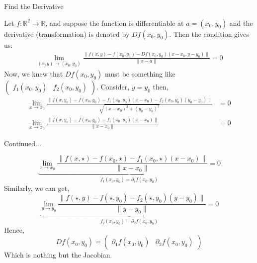 \documentclass[11pt]{beamer}
\theoremstyle{plain}
\begin{document}
\begin{frame}{Find the Derivative}
    \begin{example}
        Let $f:\mathbb R^2\rightarrow\mathbb R$, and suppose the function is differentiable at $a=(x_0,y_0)$ and the derivative (transformation) is denoted by $Df(x_0,y_0)$. Then the condition gives us:
        \begin{align*}
           \lim_{(x,y)\rightarrow(x_0,y_0)}  \frac{\| f(x,y)-f(x_0,y_0)-Df(x_0,y_0)(x-x_0,y-y_0)\|}{\|x-a\|}=0
        \end{align*}
        Now, we knew that $Df(x_0,y_0)$ must be something like $\begin{pmatrix}
            f_1(x_0,y_0)&f_2(x_0,y_0)
        \end{pmatrix}$. Consider, $y=y_0$ then, 
        \begin{align*}
            \lim_{x\rightarrow x_0}  \frac{\| f(x,y_0)-f(x_0,y_0)-f_1(x_0,y_0)(x-x_0)-f_2(x_0,y_0)(y_0-y_0)\|}{\sqrt{(x-x_0)^2+(y_0-y_0)^2}}&=0\\
            \lim_{x\rightarrow x_0}  \frac{\| f(x,y_0)-f(x_0,y_0)-f_1(x_0,y_0)(x-x_0)\|}{\|x-x_0\|}&=0
        \end{align*}
    \end{example}
\end{frame}
\begin{frame}{Continued...}
    \begin{example}
            $$
            \underbrace{\lim_{x\rightarrow x_0}  \frac{\| f(x,\star)-f(x_0,\star)-f_1(x_0,\star)(x-x_0)\|}{\|x-x_0\|}=0}_{f_1(x_0,y_0)=\partial_1f(x_0,y_0)}
            $$
            Similarly, we can get, 
            $$
            \underbrace{\lim_{y\rightarrow y_0}  \frac{\| f(\star,y)-f(\star,y_0)-f_2(\star,y_0)(y-y_0)\|}{\|y-y_0\|}=0}_{f_2(x_0,y_0)=\partial_2f(x_0,y_0)}
            $$
            Hence, 
            $$Df(x_0,y_0)=\begin{pmatrix}
                \partial_1 f(x_0,y_0)&\partial_2 f(x_0,y_0)
            \end{pmatrix}$$
            Which is nothing but the Jacobian. 
    \end{example}
\end{frame}
\end{document}
